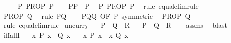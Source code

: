 \begin{isabellebody}
\ \ \ \ \ P{\isacharcolon}{\kern0pt}\ {\isachardoublequoteopen}PROP\ P{\isachardoublequoteclose}\isanewline
\ \ \isamarkupfalse%
\ PP{\isacharprime}{\kern0pt}\ \ P\ \isamarkupfalse%
\ P{\isacharprime}{\kern0pt}{\isacharcolon}{\kern0pt}\ {\isachardoublequoteopen}PROP\ P{\isacharprime}{\kern0pt}{\isachardoublequoteclose}\ \isamarkupfalse%
\ {\isacharparenleft}{\kern0pt}rule\ equal{\isacharunderscore}{\kern0pt}elim{\isacharunderscore}{\kern0pt}rule{}{\isacharparenright}{\kern0pt}\isanewline
\ \ \isamarkupfalse%
\ \isamarkupfalse%
\ {\isachardoublequoteopen}PROP\ Q{\isacharprime}{\kern0pt}{\isachardoublequoteclose}\ \isamarkupfalse%
\ {\isacharparenleft}{\kern0pt}rule\ P{\isacharprime}{\kern0pt}Q{\isacharprime}{\kern0pt}{\isacharparenright}{\kern0pt}\isanewline
\ \ \isamarkupfalse%
\ P{\isacharprime}{\kern0pt}QQ{\isacharprime}{\kern0pt}\ {\isacharbrackleft}{\kern0pt}OF\ P{\isacharprime}{\kern0pt}{\isacharcomma}{\kern0pt}\ symmetric{\isacharbrackright}{\kern0pt}\ \isamarkupfalse%
\ {\isachardoublequoteopen}PROP\ Q{\isachardoublequoteclose}\isanewline
\ \ \ \ \isamarkupfalse%
\ {\isacharparenleft}{\kern0pt}rule\ equal{\isacharunderscore}{\kern0pt}elim{\isacharunderscore}{\kern0pt}rule{}{\isacharparenright}{\kern0pt}\isanewline
{}\isamarkupfalse%
%
\endisatagproof
{\isafoldproof}%
%
\isadelimproof
\isanewline
%
\endisadelimproof
\isanewline
{}\isamarkupfalse%
\ uncurry{\isacharcolon}{\kern0pt}\isanewline
\ \ \ {\isachardoublequoteopen}P\ {\isasymlongrightarrow}\ Q\ {\isasymlongrightarrow}\ R{\isachardoublequoteclose}\isanewline
\ \ \ {\isachardoublequoteopen}P\ {\isasymand}\ Q\ {\isasymlongrightarrow}\ R{\isachardoublequoteclose}\isanewline
%
\isadelimproof
\ \ %
\endisadelimproof
%
\isatagproof
{}\isamarkupfalse%
\ assms\ \isamarkupfalse%
\ blast%
\endisatagproof
{\isafoldproof}%
%
\isadelimproof
\isanewline
%
\endisadelimproof
\isanewline
{}\isamarkupfalse%
\ iff{\isacharunderscore}{\kern0pt}allI{\isacharcolon}{\kern0pt}\isanewline
\ \ \ {\isachardoublequoteopen}{\isasymAnd}x{\isachardot}{\kern0pt}\ P\ x\ {\isacharequal}{\kern0pt}\ Q\ x{\isachardoublequoteclose}\isanewline
\ \ \ {\isachardoublequoteopen}{\isacharparenleft}{\kern0pt}{\isasymforall}x{\isachardot}{\kern0pt}\ P\ x{\isacharparenright}{\kern0pt}\ {\isacharequal}{\kern0pt}\ {\isacharparenleft}{\kern0pt}{\isasymforall}x{\isachardot}{\kern0pt}\ Q\ x{\isacharparenright}{\kern0pt}{\isachardoublequoteclose}\isanewline

\end{isabellebody}
